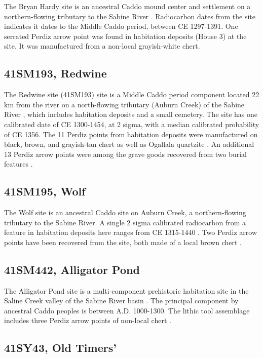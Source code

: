 \documentclass[review]{elsarticle}
\begin{document}
The Bryan Hardy site is an ancestral Caddo mound center and settlement on a northern-flowing tributary to the Sabine River \citep{RN3231}. Radiocarbon dates from the site indicates it dates to the Middle Caddo period, between CE 1297-1391. One serrated Perdiz arrow point was found in habitation deposits (House 3) at the site. It was manufactured from a non-local grayish-white chert.

\subsection*{41SM193, Redwine}

The Redwine site (41SM193) site is a Middle Caddo period component located 22 km from the river on a north-flowing tributary (Auburn Creek) of the Sabine River \citep{RN3230}, which includes habitation deposits and a small cemetery. The site has one calibrated date of CE 1300-1454, at 2 sigma, with a median calibrated probability of CE 1356. The 11 Perdiz points from habitation deposits were manufactured on black, brown, and grayish-tan chert as well as Ogallala quartzite \citep[14]{RN3230}. An additional 13 Perdiz arrow points were among the grave goods recovered from two burial features \citep[35]{RN3230}.

\subsection*{41SM195, Wolf}

The Wolf site is an ancestral Caddo site on Auburn Creek, a northern-flowing tributary to the Sabine River. A single 2 sigma calibrated radiocarbon from a feature in habitation deposits here ranges from CE 1315-1440 \citep{RN3220}. Two Perdiz arrow points have been recovered from the site, both made of a local brown chert \citep[4,5,Figure 8]{RN3220}.

\subsection*{41SM442, Alligator Pond}

The Alligator Pond site is a multi-component prehistoric habitation site in the Saline Creek valley of the Sabine River basin \citep{RN2375,RN2374}. The principal component by ancestral Caddo peoples is between A.D. 1000-1300. The lithic tool assemblage includes three Perdiz arrow points of non-local chert \citep[Figure 19c, e, j]{RN2374}.

\subsection*{41SY43, Old Timers'}
\end{document}
